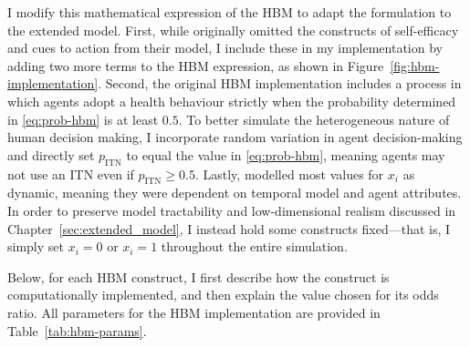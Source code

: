 I modify this mathematical expression of the HBM to adapt the formulation to the extended model. First, while \citet{durham_incorporating_2012} originally omitted the constructs of self-efficacy and cues to action from their model, I include these in my implementation by adding two more terms to the HBM expression, as shown in Figure~\ref{fig:hbm-implementation}. Second, the original HBM implementation includes a  process in which agents adopt a health behaviour strictly when the probability determined in \eqref{eq:prob-hbm} is at least $0.5$. To better simulate the heterogeneous nature of human decision making, I incorporate random variation in agent decision-making and directly set $p_{\text{ITN}}$ to equal the value in \eqref{eq:prob-hbm}, meaning agents may not use an ITN even if $p_{\text{ITN}}\ge0.5$. Lastly, \citet{durham_incorporating_2012} modelled most values for $x_i$ as dynamic, meaning they were dependent on temporal model and agent attributes. In order to preserve model tractability and low-dimensional realism discussed in Chapter~\ref{sec:extended_model}, I instead hold some constructs fixed---that is, I simply set $x_i=0$ or $x_i=1$ throughout the entire simulation.

Below, for each HBM construct, I first describe how the construct is computationally implemented, and then explain the value chosen for its odds ratio. All parameters for the HBM implementation are provided in Table~\ref{tab:hbm-params}.


